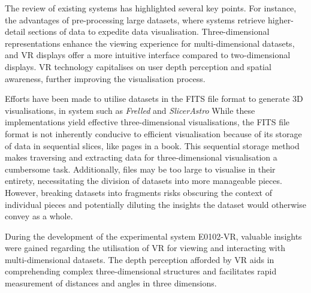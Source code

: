 

The review of existing systems has highlighted several key points. 
For instance, the advantages of pre-processing large datasets, where systems retrieve higher-detail sections of data to expedite data visualisation. 
Three-dimensional representations enhance the viewing experience for multi-dimensional datasets, and VR displays offer a more intuitive interface compared to two-dimensional displays. 
VR technology capitalises on user depth perception and spatial awareness, further improving the visualisation process.

Efforts have been made to utilise datasets in the FITS file format to generate 3D visualisations, in system such as \textit{Frelled} and \textit{SlicerAstro}
While these implementations yield effective three-dimensional visualisations, the FITS file format is not inherently conducive to efficient visualisation because of its storage of data in sequential slices, like pages in a book. 
This sequential storage method makes traversing and extracting data for three-dimensional visualisation a cumbersome task. 
Additionally, files may be too large to visualise in their entirety, necessitating the division of datasets into more manageable pieces. 
However, breaking datasets into fragments risks obscuring the context of individual pieces and potentially diluting the insights the dataset would otherwise convey as a whole.

During the development of the experimental system E0102-VR, valuable insights were gained regarding the utilisation of VR for viewing and interacting with multi-dimensional datasets. 
The depth perception afforded by VR aids in comprehending complex three-dimensional structures and facilitates rapid measurement of distances and angles in three dimensions.